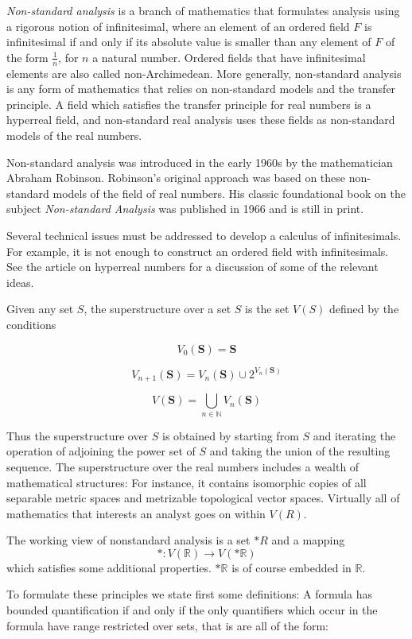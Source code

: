 \documentclass[12pt]{article}
\begin{document}
{\em Non-standard analysis} is a branch of mathematics that formulates analysis using a rigorous notion of infinitesimal, where an element of an ordered field $F$ is infinitesimal if and only if its absolute value is smaller than any element of $F$ of the form $\frac{1}{n}$, for $n$ a natural number. Ordered fields that have infinitesimal elements are also called non-Archimedean. More generally, non-standard analysis is any form of mathematics that relies on non-standard models and the transfer principle. A field which satisfies the transfer principle for real numbers is a hyperreal field, and non-standard real analysis uses these fields as non-standard models of the real numbers.

Non-standard analysis was introduced in the early 1960s by the mathematician Abraham Robinson. Robinson's original approach was based on these non-standard models of the field of real numbers. His classic foundational book on the subject {\it Non-standard Analysis} was published in 1966 and is still in print.

Several technical issues must be addressed to develop a calculus of infinitesimals. For example, it is not enough to construct an ordered field with infinitesimals. See the article on hyperreal numbers for a discussion of some of the relevant ideas.

Given any set $S$, the superstructure over a set $S$ is the set $V(S)$ defined by the conditions

$$V_0(\mathbf{S}) = \mathbf{S}$$

$$V_{n+1}(\mathbf{S}) =V_{n}(\mathbf{S}) \cup 2^{V_{n}(\mathbf{S})}$$

$$V(\mathbf{S}) = \bigcup_{n \in \mathbb{N}} V_{n}(\mathbf{S})$$

Thus the superstructure over $S$ is obtained by starting from $S$ and iterating the operation of adjoining the power set of $S$ and taking the union of the resulting sequence. The superstructure over the real numbers includes a wealth of mathematical structures: For instance, it contains isomorphic copies of all separable metric spaces and metrizable topological vector spaces. Virtually all of mathematics that interests an analyst goes on within $V(R)$.

The working view of nonstandard analysis is a set $*R$ and a mapping 
$$ *: V(\mathbb{R}) \rightarrow V(*\mathbb{R}) $$
which satisfies some additional properties.  $*\mathbb{R}$ is of course embedded in $\mathbb{R}$.

To formulate these principles we state first some definitions:
A formula has bounded quantification if and only if the only
quantifiers which occur in the formula have range restricted over sets, that is are all of the form:
\end{document}
